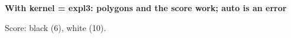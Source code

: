 \documentclass{article}
\newcommand\case[1]{\par\medskip\noindent\textbf{#1}\par\nopagebreak}
\begin{document}
\case{With kernel = expl3: polygons and the score work; auto is an error}
\begin{goban}[5]
\end{goban}
Score: black  (6), white  (10).
\end{document}
